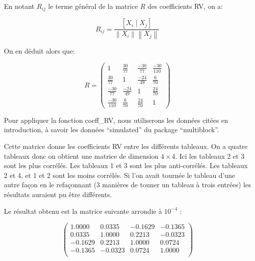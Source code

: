 \documentclass[
]{article}
\newenvironment{Shaded}{\begin{snugshade}}{\end{snugshade}}
\newcommand{\CommentTok}[1]{\textcolor[rgb]{0.56,0.35,0.01}{\textit{#1}}}
\newcommand{\FunctionTok}[1]{\textcolor[rgb]{0.13,0.29,0.53}{\textbf{#1}}}
\newcommand{\NormalTok}[1]{#1}
\newcommand{\OtherTok}[1]{\textcolor[rgb]{0.56,0.35,0.01}{#1}}
\newcommand{\SpecialCharTok}[1]{\textcolor[rgb]{0.81,0.36,0.00}{\textbf{#1}}}
\begin{document}
En notant \(R_{ij}\) le terme général de la matrice \(R\) des
coefficients RV, on a:

\[
R_{ij} = \frac{[ X_i \mid X_j]}{\left\| X_i \right\| \left\| X_j \right\| }
\]

On en déduit alors que:

\[
R = \begin{pmatrix}
1 & \frac{30}{77} & \frac{-30}{77} & \frac{-30}{110}\\
\frac{30}{77} & 1 & \frac{-24}{49} & \frac{6}{70}\\
\frac{-30}{77} & \frac{-24}{49} & 1 & \frac{24}{70}\\
\frac{-30}{110} & \frac{6}{70} & \frac{24}{70} & 1
\end{pmatrix} 
\]

Pour appliquer la fonction coeff\_RV, nous utiliserons les données
citées en introduction, à savoir les données ``simulated'' du package
``multiblock''.

\begin{Shaded}
\end{Shaded}

Cette matrice donne les coefficients RV entre les différents tableaux.
On a quatre tableaux donc on obtient une matrice de dimension
\(4\times 4\). Ici les tableaux 2 et 3 sont les plus corrélés. Les
tableaux 1 et 3 sont les plus anti-corrélés. Les tableaux 2 et 4, et 1
et 2 sont les moins corrélés. Si l'on avait tournée le tableau d'une
autre façon en le refaçonnant (3 manières de touner un tableau à trois
entrées) les résultats auraient pu être différents.

Le résultat obtenu est la matrice suivante arrondie à \(10^{-4}\) :

\[
\begin{pmatrix}
1.0000 & 0.0335 & -0.1629 & -0.1365 \\
0.0335 & 1.0000 & 0.2213 & -0.0323 \\
-0.1629 & 0.2213 & 1.0000 & 0.0724 \\
-0.1365 & -0.0323 & 0.0724 & 1.0000 \\
\end{pmatrix}
\]
\end{document}
